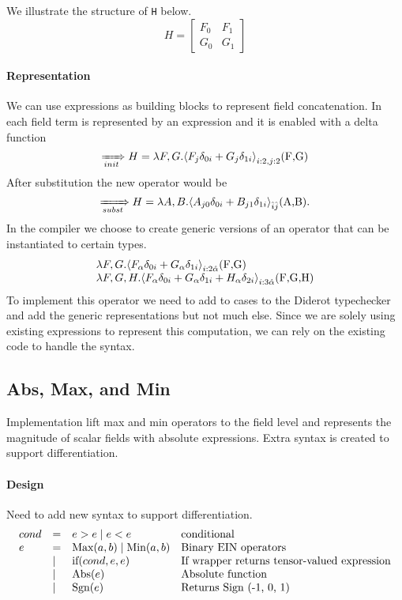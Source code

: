 \documentclass{article}
\begin{document}
\noindent We illustrate the structure of \lstinline[mathescape=true]!H! below.  
\begin{displaymath}
  H=\left[ \begin{array}{ll}
  F_0  & F_1\\
  G_0  &G_1
  \end{array}
 \right]  
 \end{displaymath}
 
\paragraph{Representation}
We can use \name{} expressions as building blocks to represent field concatenation. 
In \name{} each field term is represented by an  expression and it is enabled with a delta function 
$$\rewriteInitA{} H=\lambda F,G.\EinExp{F_{j }\delta_{0i}+G_{j }\delta_{1i}}{i:2,j:2}\text{(\lstinline[mathescape=true]!F,G!)}$$
After substitution the new \name{} operator would be 
$$\rewriteSubst{}H=\lambda A,B.\EinExp{A_{j 0}\delta_{0i}+B_{j 1}\delta_{1i}}{\hat{i}\hat{j}}\text{(\lstinline[mathescape=true]!A,B!)}.$$
In the compiler we choose to create generic versions of an \name{} operator that can be instantiated to certain types.
$$\begin{array}{l}
\lambda F,G. \EinExp{F_{\alpha }\delta_{0i}+G_{\alpha }\delta_{1i}}{{i:2} \hat{\alpha} }\text{(\lstinline[mathescape=true]!F,G!)}\\
\lambda F,G, H.\EinExp{F_{\alpha }\delta_{0i}+G_{\alpha }\delta_{1i}+H_{\alpha }\delta_{2i}}{{i:3} \hat{\alpha} }\text{(\lstinline[mathescape=true]!F,G,H!)}
\end{array}$$
To implement this operator we  need to add to cases to the Diderot typechecker and add the generic representations but not much else.
Since we are solely using existing \name{} expressions to represent this computation, we can rely on the existing code to handle the \name{} syntax.


\subsection{Abs, Max, and Min}


Implementation lift max  and min operators to the field level and represents the magnitude of scalar fields with absolute expressions. 
Extra syntax is created to support differentiation.


\paragraph{Design}
Need to add new syntax to support differentiation.
$$\begin{array}{llll}
cond &=& e>e \mid e<e & \text{conditional }\\
e&=&  \text{Max}(a,b)  \mid \text{Min}(a,b) & \text{Binary EIN{} operators}\\
&\mid & \text{if}(cond, e, e)  &\text{If wrapper returns tensor-valued expression}\\
&\mid &\text{Abs}(e) &\text{Absolute function}\\
&\mid &\text{Sgn} (e)& \text{Returns Sign (-1, 0, 1)}\\
\end{array}$$
\end{document}
